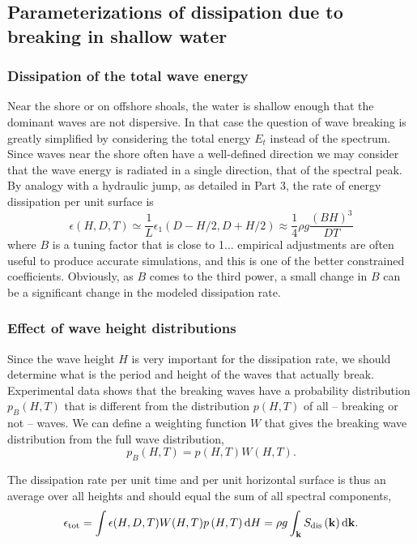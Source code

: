 \subsection{Parameterizations of dissipation due to breaking in shallow water}
\subsubsection{Dissipation of the total wave energy\label{sds:energy}}
Near the shore or on offshore shoals, the water is shallow enough that the dominant waves are not dispersive. In that 
case the question of wave breaking is greatly simplified by considering the total energy $E_t$ instead of the spectrum. 
Since waves near the shore often have a well-defined direction we may consider that the wave energy is radiated in a single direction, 
that of the spectral peak. 
By analogy with a hydraulic jump, as detailed in Part 3,
the rate of energy dissipation per unit surface is 
\begin{equation}
    \epsilon(H,D,T) \simeq \frac{1}{L}\epsilon_1(D-H/2,D+H/2) \approx \frac{1}{4}  \rho g \frac{\left(B H \right)^3}{D T}
\label{epsi_shallow_mean}
\end{equation}
where $B$ is a tuning factor that is close to 1... empirical adjustments are often useful to produce accurate simulations, and this is one of the better constrained 
coefficients. Obviously, as $B$ comes to the third power, a small change in $B$ can be a significant change in the modeled dissipation rate. 




\subsubsection{Effect of wave height distributions}
Since the wave height $H$ is very important for the dissipation rate, we should 
determine what is the period and height of the waves that actually break. Experimental data shows that the breaking waves have a probability distribution 
$p_B(H,T)$ that is different from the distribution $p(H,T)$ of all -- breaking or not -- waves. We can define 
a weighting function $W$ that gives the breaking wave distribution from the full wave distribution,
\begin{equation}
 p_B(H,T)=p(H,T)W(H,T).
\end{equation}

The dissipation rate per unit time and per unit horizontal surface is thus an average over all heights and should equal the sum of all spectral 
components,
\begin{equation}
  \epsilon_{\mathrm{tot}}=
  \int \epsilon(H,D,T) W(H,T) p\left(H,T\right) \mathrm{d} H=\rho g  \int_{\mathbf{k}} S_{\mathrm{dis}}\left(\mathbf{k}\right) \mathrm{d} \mathbf{k} .\label{Sds_tot_BJ}
\end{equation}


